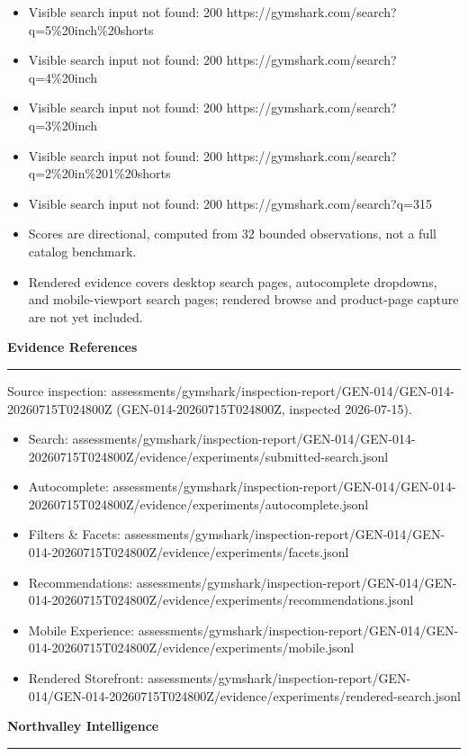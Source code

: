 \documentclass[10pt]{article}
\newcommand{\ReportSection}[1]{%
  \vspace{0.12in}
  {\fontsize{15}{18}\selectfont\bfseries\color{NVIInk}#1}\\[-0.02in]
  {\color{NVIAccent}\rule{\linewidth}{0.8pt}}
  \vspace{0.07in}
}
\newcommand{\ReportBody}[1]{{\fontsize{9.4}{11.5}\selectfont\color{NVIInk}#1}}
\newcommand{\ReportFine}[1]{{\fontsize{7.6}{9.1}\selectfont\color{NVIMuted}#1}}
\begin{document}
\begin{itemize}
\item \ReportBody{Visible search input not found: 200 https://gymshark.com/search?q=5\%20inch\%20shorts}
\item \ReportBody{Visible search input not found: 200 https://gymshark.com/search?q=4\%20inch}
\item \ReportBody{Visible search input not found: 200 https://gymshark.com/search?q=3\%20inch}
\item \ReportBody{Visible search input not found: 200 https://gymshark.com/search?q=2\%20in\%201\%20shorts}
\item \ReportBody{Visible search input not found: 200 https://gymshark.com/search?q=315}
\item \ReportBody{Scores are directional, computed from 32 bounded observations, not a full catalog benchmark.}
\item \ReportBody{Rendered evidence covers desktop search pages, autocomplete dropdowns, and mobile-viewport search pages; rendered browse and product-page capture are not yet included.}
\end{itemize}
\vspace{0.14in}
\ReportSection{Evidence References}
\ReportFine{Source inspection: assessments/gymshark/inspection-report/GEN-014/GEN-014-20260715T024800Z (GEN-014-20260715T024800Z, inspected 2026-07-15).}\par
\begin{itemize}
\item \ReportFine{Search: assessments/gymshark/inspection-report/GEN-014/GEN-014-20260715T024800Z/evidence/experiments/submitted-search.jsonl}
\item \ReportFine{Autocomplete: assessments/gymshark/inspection-report/GEN-014/GEN-014-20260715T024800Z/evidence/experiments/autocomplete.jsonl}
\item \ReportFine{Filters \& Facets: assessments/gymshark/inspection-report/GEN-014/GEN-014-20260715T024800Z/evidence/experiments/facets.jsonl}
\item \ReportFine{Recommendations: assessments/gymshark/inspection-report/GEN-014/GEN-014-20260715T024800Z/evidence/experiments/recommendations.jsonl}
\item \ReportFine{Mobile Experience: assessments/gymshark/inspection-report/GEN-014/GEN-014-20260715T024800Z/evidence/experiments/mobile.jsonl}
\item \ReportFine{Rendered Storefront: assessments/gymshark/inspection-report/GEN-014/GEN-014-20260715T024800Z/evidence/experiments/rendered-search.jsonl}
\end{itemize}
\vfill
\begin{center}
{\fontsize{16}{19}\selectfont\bfseries\color{NVIInk}Northvalley Intelligence}\\[0.06in]
{\color{NVIAccent}\rule{2.2in}{0.8pt}}\\[0.08in]
\ReportFine{\NorthvalleyContactLine}
\end{center}
\end{document}
